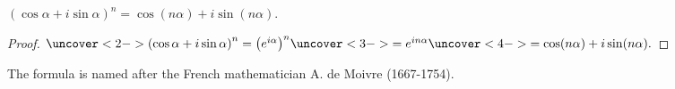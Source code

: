 \begin{frame}
\begin{theorem}
$\left(\cos \alpha+i\sin \alpha \right)^n=\cos (n\alpha)+i\sin (n\alpha)$.
\end{theorem}
\begin{proof}
$\uncover<2->{\left(\cos \alpha+i\sin \alpha\right)^n =\left( e^{i\alpha} \right)^n}\uncover<3->{=e^{in\alpha}} \uncover<4->{= \cos (n\alpha)+i\sin (n\alpha).}$
\end{proof}
The formula is named after the French mathematician A. de Moivre (1667-1754).
\end{frame}